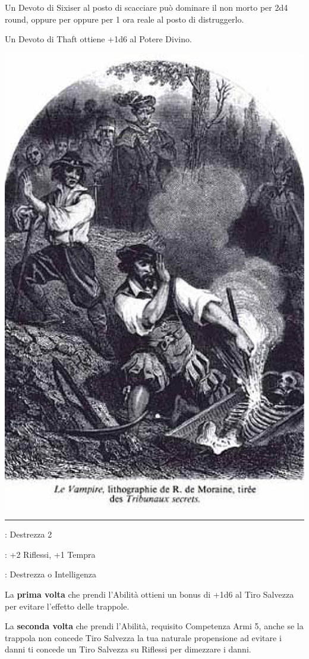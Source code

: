 \begin{multicols}{2}
Un Devoto di Sixiser al posto di scacciare può dominare il non morto per 2d4 round, oppure per oppure per 1 ora reale al posto di distruggerlo.

Un Devoto di Thaft ottiene +1d6 al Potere Divino.

\begin{center}
	\includegraphics[width=0.6\linewidth]{immagini/turning-undead-six.png}
\end{center}

\smallskip\noindent\rule{\linewidth}{2pt} \hypertarget{Schivare trappole}{}\medskip{}
\noindent
\begin{description}[noitemsep, topsep=0pt, parsep=0pt, partopsep=0pt, leftmargin=0cm, labelwidth=2.5cm]
    \item[\textbf{Requisito}]: Destrezza 2
    \item[\textbf{Tiri Salvezza}]: +2 Riflessi, +1 Tempra
    \item[\textbf{Caratteristica}]: Destrezza o Intelligenza
\end{description}

La \textbf{prima volta} che prendi l'Abilità ottieni un bonus di +1d6 al Tiro Salvezza per evitare l'effetto delle trappole.

La \textbf{seconda volta} che prendi l'Abilità, requisito Competenza Armi 5, anche se la trappola non concede Tiro Salvezza la tua naturale propensione ad evitare i danni ti concede un Tiro Salvezza su Riflessi per dimezzare i danni.


\end{multicols}
